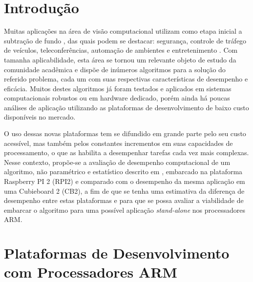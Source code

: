 \documentclass[conference]{IEEEtran}
\begin{document}




%
\IEEEpeerreviewmaketitle



\section{Introdução}
Muitas aplicações na área de visão computacional utilizam como etapa inicial a subtração de fundo \cite{IEEEhowto:sobral}, das quais podem se destacar: segurança, controle de tráfego de veículos, teleconferências, automação de ambientes e entretenimento \cite{IEEEhowto:parolin}. Com tamanha aplicabilidade, esta área se tornou um relevante objeto de estudo da comunidade acadêmica e dispõe de inúmeros algoritmos para a solução do referido problema, cada um com suas respectivas características de desempenho e eficácia. Muitos destes algoritmos já foram testados e aplicados em sistemas computacionais robustos ou em hardware dedicado\cite{IEEEhowto:oliveira}, porém ainda há poucas análises de aplicação utilizando as plataformas de desenvolvimento de baixo custo disponíveis no mercado.

O uso dessas novas plataformas tem se difundido em grande parte pelo seu custo acessível, mas também pelos constantes incrementos em suas capacidades de processamento, o que as habilita a desempenhar tarefas cada vez mais complexas. Nesse contexto, propõe-se a avaliação de desempenho computacional de um algoritmo, não paramétrico e estatístico descrito em \cite{IEEEhowto:horprasert}, embarcado na plataforma Raspberry PI 2 (RPI2) e comparado com o desempenho da mesma aplicação em uma Cubieboard 2 (CB2), a fim de que se tenha uma estimativa da diferença de desempenho entre estas plataformas e para que se possa avaliar a viabilidade de embarcar o algoritmo para uma possível aplicação \textit{stand-alone} nos processadores ARM.


\section{Plataformas de Desenvolvimento com Processadores ARM}
\end{document}
